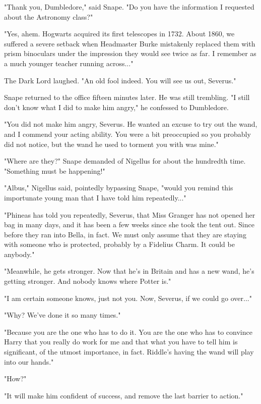 "Thank you, Dumbledore," said Snape. "Do you have the information I requested about the Astronomy class?"

"Yes, ahem. Hogwarts acquired its first telescopes in 1732. About 1860, we suffered a severe setback when Headmaster Burke mistakenly replaced them with prism binoculars under the impression they would see twice as far. I remember as a much younger teacher running across..."

The Dark Lord laughed. "An old fool indeed. You will see us out, Severus."

Snape returned to the office fifteen minutes later. He was still trembling. "I still don't know what I did to make him angry," he confessed to Dumbledore.

"You did not make him angry, Severus. He wanted an excuse to try out the wand, and I commend your acting ability. You were a bit preoccupied so you probably did not notice, but the wand he used to torment you with was mine."

\sbreak

"Where are they?" Snape demanded of Nigellus for about the hundredth time. "Something must be happening!"

"Albus," Nigellus said, pointedly bypassing Snape, "would you remind this importunate young man that I have told him repeatedly..."

"Phineas has told you repeatedly, Severus, that Miss Granger has not opened her bag in many days, and it has been a few weeks since she took the tent out. Since before they ran into Bella, in fact. We must only assume that they are staying with someone who is protected, probably by a Fidelius Charm. It could be anybody."

"Meanwhile, he gets stronger. Now that he's in Britain and has a new wand, he's getting stronger. And nobody knows where Potter is."

"I am certain someone knows, just not you. Now, Severus, if we could go over..."

"Why? We've done it so many times."

"Because you are the one who has to do it. You are the one who has to convince Harry that you really do work for me and that what you have to tell him is significant, of the utmost importance, in fact. Riddle's having the wand will play into our hands."

"How?"

"It will make him confident of success, and remove the last barrier to action."

